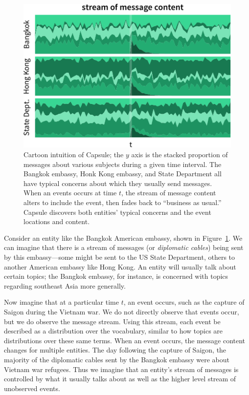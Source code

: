 \begin{figure}
\centering
\includegraphics[width=\linewidth]{fig/cartoon.pdf}
\caption{Cartoon intuition of Capsule; the $y$ axis is the stacked proportion of messages about various subjects during a given time interval.  The Bangkok embassy, Honk Kong embassy, and State Department all have typical concerns about which they usually send messages.  When an events occurs at time $t$, the stream of message content alters to include the event, then fades back to ``business as usual.''  Capsule discovers both entities' typical concerns and the event locations and content.}
\label{fig:cartoon}
\end{figure}

Consider an entity like the Bangkok American embassy, shown in Figure~\ref{fig:cartoon}.  We can imagine that there is a stream of messages (or \emph{diplomatic cables}) being sent by this embassy---some might be sent to the US State Department, others to another American embassy like Hong Kong.  An entity will usually talk about certain topics; the Bangkok embassy, for instance, is concerned with topics regarding southeast Asia more generally.

Now imagine that at a particular time $t$, an event occurs, such as the capture of Saigon during the Vietnam war.  We do not directly observe that events occur, but we do observe the message stream.  Using this stream, each event be described as a distribution over the vocabulary, similar to how topics are distributions over these same terms.  When an event occurs, the message content changes for multiple entities. The day following the capture of Saigon, the majority of the diplomatic cables sent by the Bangkok embassy were about Vietnam war refugees.
Thus we imagine that an entity's stream of messages is controlled by what it usually talks about as well as the higher level stream of unobserved events.

